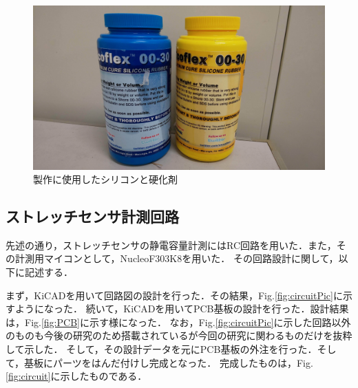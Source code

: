 \begin{figure}[h]
    \begin{center}
        \includegraphics[width=0.6\columnwidth,clip]{./2_measurement/silicon.eps}
        \caption{製作に使用したシリコンと硬化剤}
        \label{fig:silicon}
    \end{center}
\end{figure}

\newpage
\subsection{ストレッチセンサ計測回路}

先述の通り，ストレッチセンサの静電容量計測にはRC回路を用いた．また，その計測用マイコンとして，NucleoF303K8を用いた．
その回路設計に関して，以下に記述する．

まず，KiCADを用いて回路図の設計を行った．その結果，Fig.\ref{fig:circuitPic}に示すようになった．
続いて，KiCADを用いてPCB基板の設計を行った．設計結果は，Fig.\ref{fig:PCB}に示す様になった．
なお，Fig.\ref{fig:circuitPic}に示した回路以外のものも今後の研究のため搭載されているが今回の研究に関わるものだけを抜粋して示した．
そして，その設計データを元にPCB基板の外注を行った．そして，基板にパーツをはんだ付けし完成となった．
完成したものは，Fig.\ref{fig:circuit}に示したものである．

